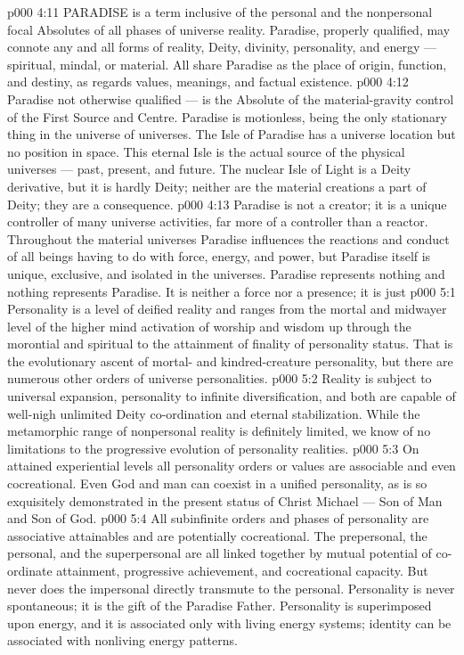 \vs p000 4:11 \pc PARADISE is a term inclusive of the personal and the nonpersonal focal Absolutes of all phases of universe reality. Paradise, properly qualified, may connote any and all forms of reality, Deity, divinity, personality, and energy --- spiritual, mindal, or material. All share Paradise as the place of origin, function, and destiny, as regards values, meanings, and factual existence.
\vs p000 4:12 \pc {} Paradise not otherwise qualified --- is the Absolute of the material\hyp{}gravity control of the First Source and Centre. Paradise is motionless, being the only stationary thing in the universe of universes. The Isle of Paradise has a universe location but no position in space. This eternal Isle is the actual source of the physical universes --- past, present, and future. The nuclear Isle of Light is a Deity derivative, but it is hardly Deity; neither are the material creations a part of Deity; they are a consequence.
\vs p000 4:13 Paradise is not a creator; it is a unique controller of many universe activities, far more of a controller than a reactor. Throughout the material universes Paradise influences the reactions and conduct of all beings having to do with force, energy, and power, but Paradise itself is unique, exclusive, and isolated in the universes. Paradise represents nothing and nothing represents Paradise. It is neither a force nor a presence; it is just 
\vs p000 5:1 Personality is a level of deified reality and ranges from the mortal and midwayer level of the higher mind activation of worship and wisdom up through the morontial and spiritual to the attainment of finality of personality status. That is the evolutionary ascent of mortal\hyp{} and kindred\hyp{}creature personality, but there are numerous other orders of universe personalities.
\vs p000 5:2 Reality is subject to universal expansion, personality to infinite diversification, and both are capable of well\hyp{}nigh unlimited Deity co\hyp{}ordination and eternal stabilization. While the metamorphic range of nonpersonal reality is definitely limited, we know of no limitations to the progressive evolution of personality realities.
\vs p000 5:3 On attained experiential levels all personality orders or values are associable and even cocreational. Even God and man can coexist in a unified personality, as is so exquisitely demonstrated in the present status of Christ Michael --- Son of Man and Son of God.
\vs p000 5:4 All subinfinite orders and phases of personality are associative attainables and are potentially cocreational. The prepersonal, the personal, and the superpersonal are all linked together by mutual potential of co\hyp{}ordinate attainment, progressive achievement, and cocreational capacity. But never does the impersonal directly transmute to the personal. Personality is never spontaneous; it is the gift of the Paradise Father. Personality is superimposed upon energy, and it is associated only with living energy systems; identity can be associated with nonliving energy patterns.
